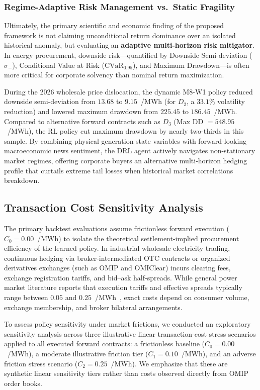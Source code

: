 \subsubsection{Regime-Adaptive Risk Management vs.\ Static Fragility}

Ultimately, the primary scientific and economic finding of the proposed framework is not claiming unconditional return dominance over an isolated historical anomaly, but evaluating an \textbf{adaptive multi-horizon risk mitigator}. In energy procurement, downside risk---quantified by Downside Semi-deviation ($\sigma_-$), Conditional Value at Risk ($\text{CVaR}_{0.95}$), and Maximum Drawdown---is often more critical for corporate solvency than nominal return maximization.

During the 2026 wholesale price dislocation, the dynamic M8-W1 policy reduced downside semi-deviation from $13.68$ to $9.15$~\texteuro/MWh (for $D_2$, a $33.1\%$ volatility reduction) and lowered maximum drawdown from $225.45$ to $186.45$~\texteuro/MWh. Compared to alternative forward contracts such as $D_3$ (Max DD $= 548.95$~\texteuro/MWh), the RL policy cut maximum drawdown by nearly two-thirds in this sample. By combining physical generation state variables with forward-looking macroeconomic news sentiment, the DRL agent actively navigates non-stationary market regimes, offering corporate buyers an alternative multi-horizon hedging profile that curtails extreme tail losses when historical market correlations breakdown.
\subsection{Transaction Cost Sensitivity Analysis}
\label{subsec:trans_costs}

The primary backtest evaluations assume frictionless forward execution ($C_0 = 0.00$~\texteuro/MWh) to isolate the theoretical settlement-implied procurement efficiency of the learned policy. In industrial wholesale electricity trading, continuous hedging via broker-intermediated OTC contracts or organized derivatives exchanges (such as OMIP and OMIClear) incurs clearing fees, exchange registration tariffs, and bid--ask half-spreads. While general power market literature reports that execution tariffs and effective spreads typically range between $0.05$ and $0.25$~\texteuro/MWh~\cite{weron2014electricity}, exact costs depend on consumer volume, exchange membership, and broker bilateral arrangements.

To assess policy sensitivity under market frictions, we conducted an exploratory sensitivity analysis across three illustrative linear transaction-cost stress scenarios applied to all executed forward contracts: a frictionless baseline ($C_0 = 0.00$~\texteuro/MWh), a moderate illustrative friction tier ($C_1 = 0.10$~\texteuro/MWh), and an adverse friction stress scenario ($C_2 = 0.25$~\texteuro/MWh). We emphasize that these are synthetic linear sensitivity tiers rather than costs observed directly from OMIP order books.

